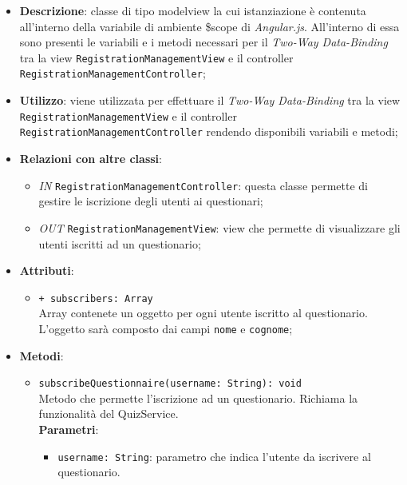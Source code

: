 	\begin{itemize}
		\item \textbf{Descrizione}: classe di tipo modelview la cui istanziazione è contenuta all'interno della variabile di ambiente \$scope di \textit{Angular.js}. All'interno di essa sono presenti le variabili e i metodi necessari per il \textit{Two-Way Data-Binding} tra la view \texttt{RegistrationManagementView} e il controller \texttt{RegistrationManagementController};
		\item \textbf{Utilizzo}: viene utilizzata per effettuare il \textit{Two-Way Data-Binding} tra la view \texttt{RegistrationManagementView} e il controller \texttt{RegistrationManagementController} rendendo disponibili variabili e metodi;
		\item \textbf{Relazioni con altre classi}: 
		\begin{itemize}
			\item \textit{IN} \texttt{RegistrationManagementController}: questa classe permette di gestire le iscrizione degli utenti ai questionari;
			\item \textit{OUT} \texttt{RegistrationManagementView}: view che permette di visualizzare gli utenti iscritti ad un questionario; 
		\end{itemize}
		\item \textbf{Attributi}: 
		\begin{itemize}
			\item \texttt{+ subscribers: Array} \\ Array contenete un oggetto per ogni utente iscritto al questionario. L'oggetto sarà composto dai campi \texttt{nome} e \texttt{cognome};
		\end{itemize}
		\item \textbf{Metodi}: 
		\begin{itemize}
			\item \texttt{subscribeQuestionnaire(username: String): void} \\ Metodo che permette l'iscrizione ad un questionario. Richiama la funzionalità del QuizService. \\
			\textbf{Parametri}:
			\begin{itemize}
				\item \texttt{username: String}: parametro che indica l'utente da iscrivere al questionario.
			\end{itemize}
		\end{itemize}
	\end{itemize}
	
	